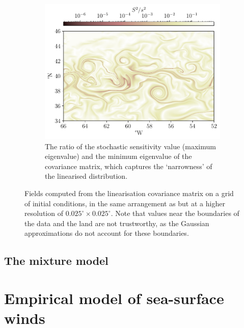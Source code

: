 \begin{figure}
\begin{center}
\begin{subfigure}[t]{0.49\textwidth}
			\includegraphics[width=\textwidth]{chp06_applications/figures/gulf_stream/ratio_field_high}
			\caption{The ratio of the stochastic sensitivity value (maximum eigenvalue) and the minimum eigenvalue of the covariance matrix, which captures the `narrowness' of the linearised distribution.}
		\end{subfigure}
		\caption{Fields computed from the linearisation covariance matrix on a grid of initial conditions, in the same arrangement as  but at a higher resolution of \(0.025^\circ \times 0.025^\circ\).
			Note that values near the boundaries of the data and the land are not trustworthy, as the Gaussian approximations do not account for these boundaries.}
		\label{fig:na_s2_high}
	\end{center}
\end{figure}


\subsection{The mixture model}




\section{Empirical model of sea-surface winds}

